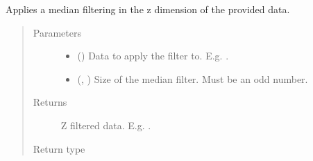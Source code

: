 \documentclass[letterpaper,10pt,english]{sphinxmanual}
\begin{document}
\begin{fulllineitems}
\label{\detokenize{data/post_processing/post_processing:data.post_processing.post_processing.calculate_z_filtering}}
Applies a median filtering in the z dimension of the provided data.
\begin{quote}\begin{description}
\item[{Parameters}] \leavevmode\begin{itemize}
\item {} 
 () \textendash{} Data to apply the filter to. E.g. .

\item {} 
 (, ) \textendash{} Size of the median filter. Must be an odd number.

\end{itemize}

\item[{Returns}] \leavevmode
{} \textendash{} Z filtered data. E.g. .

\item[{Return type}] \leavevmode
{}

\end{description}\end{quote}

\end{fulllineitems}

\end{document}
